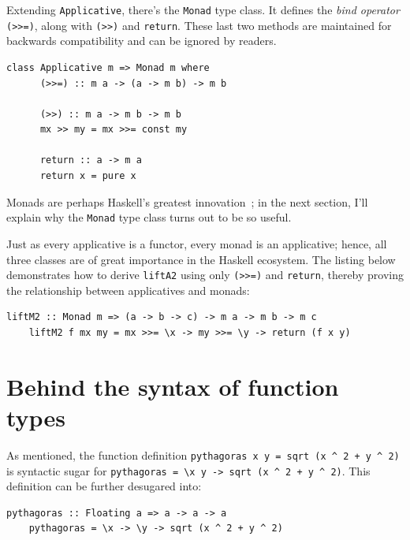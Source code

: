 \documentclass[UdineBachThesis,american,11pt]{PhdThesis}
\begin{document}
  Extending \mbox{\texttt{Applicative}}, there's the \mbox{\texttt{Monad}} type
  class. It defines the \emph{bind operator} \mbox{\texttt{(>>=)}}, along with
  \mbox{\texttt{(>>)}} and \mbox{\texttt{return}}. These last two methods are
  maintained for backwards compatibility and can be ignored by readers.

  \begin{Verbatim}[gobble=4,fontsize=\small]
    class Applicative m => Monad m where
      (>>=) :: m a -> (a -> m b) -> m b

      (>>) :: m a -> m b -> m b
      mx >> my = mx >>= const my

      return :: a -> m a
      return x = pure x
  \end{Verbatim}

  Monads are perhaps Haskell's greatest
  innovation~\cite{monads-for-functional-programming}; in the next section, I'll
  explain why the \mbox{\texttt{Monad}} type class turns out to be so useful.

  Just as every applicative is a functor, every monad is an applicative; hence,
  all three classes are of great importance in the Haskell ecosystem. The
  listing below demonstrates how to derive \mbox{\texttt{liftA2}} using only
  \mbox{\texttt{(>>=)}} and \mbox{\texttt{return}}, thereby proving the
  relationship between applicatives and monads:

  \begin{Verbatim}[gobble=4,fontsize=\small]
    liftM2 :: Monad m => (a -> b -> c) -> m a -> m b -> m c
    liftM2 f mx my = mx >>= \x -> my >>= \y -> return (f x y)
  \end{Verbatim}

  \newpage

  \section{Behind the syntax of function types}

  As mentioned, the function definition
  \mbox{\texttt{pythagoras x y = sqrt (x {\textasciicircum} 2 + y {\textasciicircum} 2)}}
  is syntactic sugar for
  \mbox{\texttt{pythagoras = \textbackslash x y -> sqrt (x {\textasciicircum} 2 + y {\textasciicircum} 2)}}.
  This definition can be further desugared into:

  \begin{Verbatim}[gobble=4,fontsize=\small]
    pythagoras :: Floating a => a -> a -> a
    pythagoras = \x -> \y -> sqrt (x ^ 2 + y ^ 2)
  \end{Verbatim}
\end{document}
